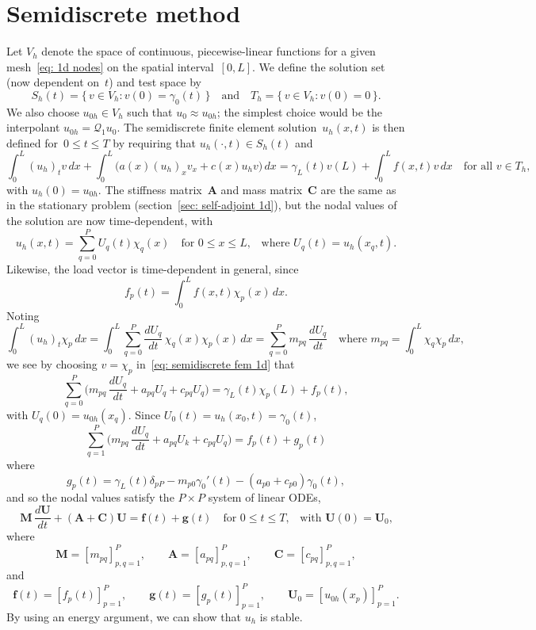 \section{Semidiscrete method}\label{sec: semidiscrete parabolic FEM}
Let $V_h$ denote the space of continuous, piecewise-linear functions for a 
given mesh~\eqref{eq: 1d nodes} on the spatial interval~$[0,L]$.  We define the 
solution set (now dependent on~$t$) and test space by
\[
S_h(t)=\{\,v\in V_h:v(0)=\gamma_0(t)\,\}
\quad\text{and}\quad
T_h=\{\,v\in V_h:v(0)=0\,\}.
\]
We also choose $u_{0h}\in V_h$ such that $u_0\approx u_{0h}$; the simplest 
choice would be the interpolant $u_{0h}=\mathcal{Q}_1u_0$. The semidiscrete
finite element solution~$u_h(x,t)$ is then defined for~$0\le t\le T$ by 
requiring that $u_h(\cdot,t)\in S_h(t)$ and
\begin{equation}\label{eq: semidiscrete fem 1d}
\int_0^L(u_h)_tv\,dx+\int_0^L\bigl(a(x)(u_h)_xv_x+c(x)u_hv\bigr)\,dx
    =\gamma_L(t)v(L)+\int_0^Lf(x,t)v\,dx
\quad\text{for all $v\in T_h$,}
\end{equation}
with $u_h(0)=u_{0h}$. The stiffness matrix~$\boldsymbol{A}$ and mass 
matrix~$\boldsymbol{C}$ are the same as in the stationary problem 
(section~\ref{sec: self-adjoint 1d}), but the nodal 
values of the solution are now time-dependent, with
\[
u_h(x,t)=\sum_{q=0}^P U_q(t)\chi_q(x)\quad\text{for $0\le x\le L$,}\quad
\text{where $U_q(t)=u_h(x_q,t)$.}
\]
Likewise, the load vector is time-dependent in general, since 
\[
f_p(t)=\int_0^Lf(x,t)\chi_p(x)\,dx.
\]
Noting 
\[
\int_0^L(u_h)_t\chi_p\,dx=\int_0^L\sum_{q=0}^P
    \frac{dU_q}{dt}\,\chi_q(x)\chi_p(x)\,dx=\sum_{q=0}^P m_{pq}\,\frac{dU_q}{dt}
    \quad\text{where $m_{pq}=\int_0^L\chi_q\chi_p\,dx$,}
\]
we see by choosing $v=\chi_p$ in~\eqref{eq: semidiscrete fem 1d} that
\[
\sum_{q=0}^P\biggl(m_{pq}\,\frac{dU_q}{dt}+a_{pq}U_q+c_{pq}U_q\biggr)
    =\gamma_L(t)\chi_p(L)+f_p(t),
\]
with $U_q(0)=u_{0h}(x_q)$.  Since $U_0(t)=u_h(x_0,t)=\gamma_0(t)$,
\[
\sum_{q=1}^P\biggl(m_{pq}\,\frac{dU_q}{dt}+a_{pq}U_k+c_{pq}U_q\biggr)
    =f_p(t)+g_p(t)
\]
where
\[
g_p(t)=\gamma_L(t)\delta_{pP}-m_{p0}\gamma_0'(t)-(a_{p0}+c_{p0})\gamma_0(t),
\]
and so the nodal values satisfy the $P\times P$ system of linear ODEs,
\begin{equation}\label{eq: semidiscrete fem 1d ODE}
\boldsymbol{M}\,\frac{d\boldsymbol{U}}{dt}
+(\boldsymbol{A}+\boldsymbol{C})\boldsymbol{U}=\boldsymbol{f}(t)
    +\boldsymbol{g}(t)\quad\text{for $0\le t\le T$,}
    \quad\text{with $\boldsymbol{U}(0)=\boldsymbol{U}_0$,}
\end{equation}
where 
\[
\boldsymbol{M}=[m_{pq}]_{p,q=1}^P,\qquad 
\boldsymbol{A}=[a_{pq}]_{p,q=1}^P,\qquad
\boldsymbol{C}=[c_{pq}]_{p,q=1}^P,
\]
and
\[
\boldsymbol{f}(t)=[f_p(t)]_{p=1}^P,\qquad
\boldsymbol{g}(t)=[g_p(t)]_{p=1}^P,\qquad
\boldsymbol{U}_0=[u_{0h}(x_p)]_{p=1}^P.
\]
By using an energy argument, we can show that $u_h$ is stable.

